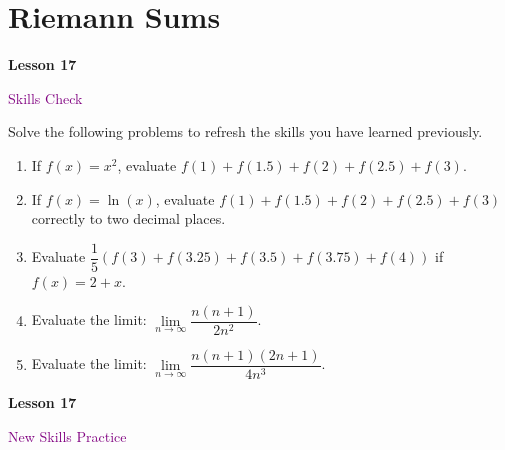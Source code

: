 \documentclass[10pt]{book}
\theoremstyle{definition}
\theoremstyle{remark}
\begin{document}
\section{Riemann Sums}
\begin{tcolorbox}[
  width=\textwidth,
  colback=gray!10, %
  colframe=white, %
  boxrule=0pt,    %
  left=1cm,       %
  right=1cm,      %
  sharp corners  %
]

\begin{minipage}[t]{0.5\textwidth}
  \Huge \textbf{Lesson 17}
\end{minipage}%
\hfill
\begin{minipage}[t]{0.5\textwidth}
  \Huge \textcolor{purple}{Skills Check}
\end{minipage}
\end{tcolorbox}

\begin{large}
\noindent
Solve the following problems to refresh the skills you have learned previously.
\begin{enumerate}
\item If $f(x)=x^{2}$, evaluate $f(1)+f(1.5)+f(2)+f(2.5)+f(3)$.\vfil \vfil \vfil
\item If $f(x)=\ln(x)$, evaluate $f(1)+f(1.5)+f(2)+f(2.5)+f(3)$ correctly to two decimal places.\vfil \vfil\vfil
\item Evaluate $\dfrac{1}{5} \left( f(3)+f(3.25)+f(3.5)+f(3.75)+f(4) \right)$ if $f(x)=2+x$.\vfil \vfil \vfil
\item Evaluate the limit: $\lim\limits_{n \rightarrow \infty} \dfrac{n(n+1)}{2n^{2}}$.\vfil \vfil \vfil
\item Evaluate the limit: $\lim\limits_{n \rightarrow \infty} \dfrac{n(n+1)(2n+1)}{4n^{3}}$.\vfil \vfil \vfil
\end{enumerate}
\end{large}
\newpage


\begin{tcolorbox}[
  width=\textwidth,
  colback=gray!10, %
  colframe=white, %
  boxrule=0pt,    %
  left=1cm,       %
  right=1cm,      %
  sharp corners  %
]

\begin{minipage}[t]{0.5\textwidth}
  \Huge \textbf{Lesson 17}
\end{minipage}%
\hfill
\begin{minipage}[t]{0.5\textwidth}
  \Huge\textcolor{purple}{New Skills Practice}
\end{minipage}
\end{tcolorbox}
\end{document}
